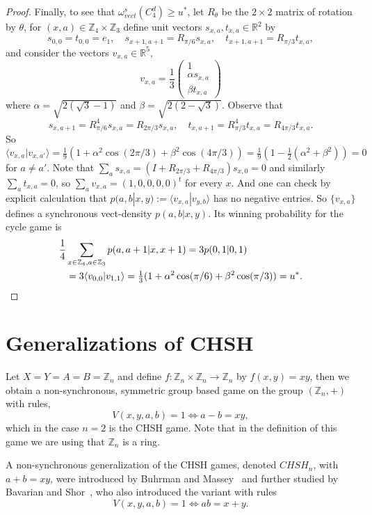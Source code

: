 \documentclass[11pt]{amsart}
\theoremstyle{definition}
\newcommand{\bb}[1]{\mathbb{#1}}
\begin{document}
\begin{proof}
  Finally, to see that $\omega_{vect}^s(C_4^d)\ge u^*$,
  let  $R_\theta$ be the $2\times 2$ matrix of rotation by $\theta$, for $(x,a)\in \bb Z_4\times \bb Z_3$ define unit vectors $s_{x,a},t_{x,a}\in \bb R^2$ by
   \[s_{0,0}=t_{0,0}=e_1,\quad s_{x+1,a+1}=R_{\pi/6}s_{x,a},\quad t_{x+1,a+1}=R_{\pi/3}t_{x,a},\]
   and consider the vectors $v_{x,a}\in \bb R^5$,
  \[ v_{x,a}=\frac13\begin{pmatrix}1\\ \alpha s_{x,a}\\\beta t_{x,a}
     \end{pmatrix}
   \]
   where $\alpha=\sqrt{2(\sqrt{3}-1)}$ and $\beta=\sqrt{2(2-\sqrt3)}$. Observe that
   \[ s_{x,a+1}=R_{\pi/6}^4s_{x,a}=R_{2\pi/3}s_{x,a},\quad
     t_{x,a+1}=R_{\pi/3}^4t_{x,a}=R_{4\pi/3}t_{x,a}.\] So
   \[\langle
    v_{x,a}|v_{x,a'}\rangle=\tfrac19(1+\alpha^2\cos(2\pi/3)+\beta^2\cos(4\pi/3))=\tfrac19(1-\tfrac12(\alpha^2+\beta^2))=0\]
   for $a\ne a'$.  Note that
   $\sum_{a}s_{x,a}=(I+R_{2\pi/3}+R_{4\pi/3})s_{x,0}=0$ and similarly
   $\sum_at_{x,a}=0$, so $\sum_a v_{x,a}=(1,0,0,0,0)^t$ for every
   $x$. And one can check by explicit calculation that
   $p(a,b|x,y):=\langle v_{x,a}|v_{y,b}\rangle$ has no negative
   entries. So $\{v_{x,a}\}$ defines a synchronous vect-density $p(a,b|x,y)$. Its
   winning probability for the cycle game is
   \begin{align*}\frac14&\sum_{x\in \bb Z_4,a\in \bb Z_3}p(a,a+1|x,x+1)=3p(0,1|0,1)\\&=3\langle
     v_{0,0}|v_{1,1}\rangle=\tfrac13(1+\alpha^2\cos(\pi/6)+\beta^2\cos(\pi/3))=u^*.\qedhere
   \end{align*}
 \end{proof}

\section{Generalizations of CHSH}

Let $X = Y = A = B = \bb Z_n$ and define $f: \bb Z_n \times \bb Z_n \to \bb Z_n$ by $f(x,y) = xy$, then we obtain a non-synchronous, symmetric group based game on the group $(\bb Z_n, +)$ with rules,
\[ V(x,y,a,b) =1 \iff a -b = xy,\]
which in the case $n=2$ is the CHSH game.  Note that in the definition of this game we are using that $\bb Z_n$ is a ring.

A non-synchronous generalization of the CHSH games, denoted $CHSH_n$, with $a+b=xy$, were introduced by Buhrman and Massey~\cite{BM} and further studied by Bavarian and Shor~\cite{BS}, who also introduced the variant with rules
\[ V(x,y,a,b) =1 \iff ab= x+y.\]
\end{document}
